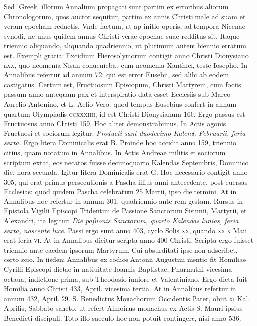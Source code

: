 \begin{parnumbers}
{}
Sed \textgreek{[Greek]} illorum
Annalium propagati sunt partim ex erroribus aliorum Chronologorum,
quos auctor sequitur, partim ex annis Christi male ad
suam et veram epocham reductis.
\lnr{}Vnde factum, ut ap initio operis,
ad tempora Nicenae synodi, ne unus quidem annus Christi
verae epochae suae redditus sit.
\lnr{}Itaque triennio aliquando, aliquando
quadriennio, ut plurimum autem biennio erratum est.
\lnr{}Exempli
gratia: Excidium Hierosolymorum contigit anno Christi
Dionysiano \textsc{lxx}, quo neomenia Nisan conueniebat cum neomenia
Xanthici, teste Iosepho.
\lnr{}In Annalibus refertur ad annum
72: qui est error Eusebii, sed alibi ab eodem castigatus.
\lnr{}Certum est, Fructuosum Episcopum, Christi Martyrem, cum fociis
passum anno antequam pax et interspiratio data esset Ecclesiis
sub Marco Aurelio Antonino, et L. Aelio Vero.
\lnr{}quod tempus Eusebius confert in annum quartum Olympiadis \textsc{ccxxxiiii},
id est Christi Dionysianum 160.
\lnr{}Ergo passus est Fructuosus anno Christi
159.
\lnr{}Hoc aliter demonstrabimus.
\lnr{}In Actis agonis Fructuosi et
sociorum legitur: \textit{Producti sunt duodecimo Kalend. Februarii, feria
sexta.}
\lnr{}Ergo litera Dominicalis erat B.
\lnr{}Proinde hoc accidit anno
159, triennio citius, quam notatum in Annalibus.
\lnr{}In Actis Andreae
militis et sociorum scriptum extat, eos necatos fuisse decimoquarto
Kalendas Septembris, Dominico die, hora secunda.
\lnr{}Igitur litera Dominicalis erat G.
\lnr{}Hoc necessario contigit anno 305,
qui erat primus persecutionis a Pascha illius anni antecedente, post
euersas Ecclesias: quod quidem Pascha celebratum 25 Martii, ipso
die termini.
\lnr{}At in Annalibus hoc refertur in annum 301, quadriennio
ante rem gestam.
\lnr{}Rursus in Epistola Vigilii Episcopi Tridentini
de Passione Sanctorum Sisinnii, Martyrii, et Alexandri,
ita legitur: \textit{Die paßionis Sanctorum, quarto Kalendas lunias, feria
sexta, nascente luce.}
\lnr{}Passi ergo sunt anno 403, cyclo Solis \textsc{xx}, quando
\textsc{xxix} Maii erat feria \textsc{vi}.
\lnr{}At in Annalibus dicitur scripta
anno 400 Christi.
\lnr{}Scripta ergo fuisset triennio ante caedem
ipsorum Martyrum.
\lnr{}Cui absurditati ipse non adscribet, certo scio.
\lnr{}In iisdem
Annalibus ex codice Antonii Augustini mentio fit Homiliae
Cyrilli Episcopi dictae in natiuitate Ioannis Baptistae, Pharmuthi
vicesima octaua, indictione prima, sub Theodosio iuniore et Valentiniano.
\lnr{}Ergo dicta fuit Homilia anno Christi 433, April. vicesima
tertia.
\lnr{}At in Annalibus refertur in annum 432, April. 29. S. Benedictus
Monachorum Occidentis Pater, obiit \textsc{xi} Kal. Aprilis, Sabbato
sancto, ut refert Aimoinus monachus ex Actis S. Mauri ipsius
Benedicti discipuli.
\lnr{}Toto illo saeculo hoc non potuit contingere, nisi
anno 536.


\end{parnumbers}
